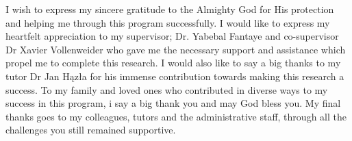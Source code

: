%
I wish to express my sincere gratitude to the Almighty God for His protection and helping me through this program successfully. I would like to express my heartfelt appreciation to my supervisor; Dr. Yabebal Fantaye and co-supervisor Dr Xavier Vollenweider who  gave me the necessary support and assistance which propel me to complete this research. I would also like to say a big thanks to my tutor Dr Jan Hązła for his immense contribution towards making this research a success. To my  family and loved ones who contributed in diverse ways to my success in this program, i say a big thank you and may God bless you.  My final thanks goes to  my colleagues, tutors and the administrative staff,  through all the challenges you still remained supportive.